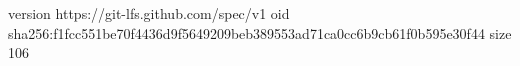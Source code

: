version https://git-lfs.github.com/spec/v1
oid sha256:f1fcc551be70f4436d9f5649209beb389553ad71ca0cc6b9cb61f0b595e30f44
size 106
